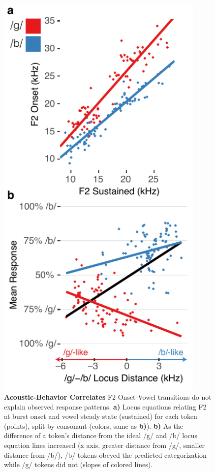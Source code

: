\begin{figure}[!ht]
\includegraphics[width=4in]{speech/figures/Figure5.pdf}
\caption{\textbf{Acoustic-Behavior Correlates} F2 Onset-Vowel transitions do not explain observed response patterns. \textbf{a)} Locus equations relating F2 at burst onset and vowel steady state (sustained) for each token (points), split by consonant (colors, same as \textbf{b)}). \textbf{b)} As the difference of a token's distance from the ideal /g/ and /b/ locus equation lines increased (x axis, greater distance from /g/, smaller distance from /b/), /b/ tokens obeyed the predicted categorization while /g/ tokens did not (slopes of colored lines). \vspace{24pt}}
\label{acoustic}
\end{figure}

